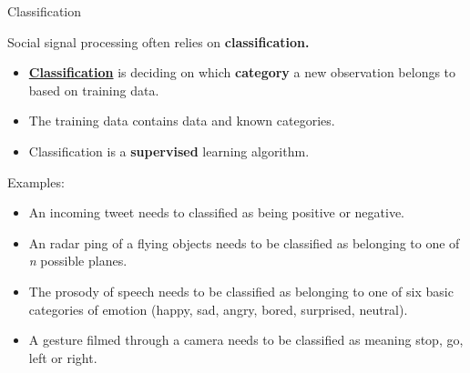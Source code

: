 \documentclass[compress]{beamer}
\begin{document}
\begin{frame}{Classification}

Social signal processing often relies on \textbf{classification.}

\begin{itemize}
    \item \href{https://en.wikipedia.org/wiki/Statistical_classification}{\textbf{Classification}}
        is deciding on which \textbf{category} a new observation belongs to
        based on training data.

    \item The training data contains data and known categories.
    \item Classification is a \textbf{supervised} learning algorithm.
\end{itemize}

\pause

Examples:

\scriptsize
\begin{itemize}

\item An incoming tweet needs to classified as being positive or negative.
\item An radar ping of a flying objects needs to be classified as belonging
  to one of \emph{n} possible planes.
\item The prosody of speech needs to be classified as belonging to one of
  six basic categories of emotion (happy, sad, angry, bored, surprised,
  neutral).
\item A gesture filmed through a camera needs to be classified as meaning
  stop, go, left or right.
\end{itemize}

\end{frame}
\end{document}
